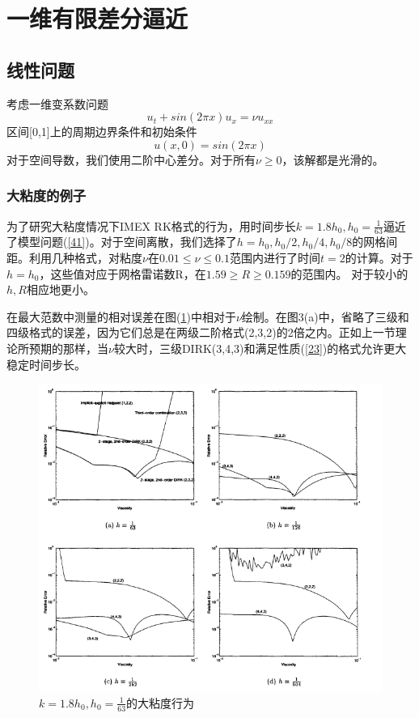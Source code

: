 \documentclass[12pt,a4paper]{article}
\begin{document}
\section{一维有限差分逼近}
\subsection{线性问题}

考虑一维变系数问题
\begin{equation}
u_{t}+sin(2\pi x)u_{x}=\nu u_{xx}
\label{41}
\end{equation}
区间[0,1]上的周期边界条件和初始条件
\begin{equation*}
u(x,0)=sin(2\pi x)
\end{equation*}
对于空间导数，我们使用二阶中心差分。对于所有$\nu\ge 0$，该解都是光滑的。

\subsubsection{大粘度的例子}

为了研究大粘度情况下IMEX RK格式的行为，用时间步长$k=1.8h_{0},h_{0}=\frac{1}{63}$逼近了模型问题(\ref{41})。对于空间离散，我们选择了$h=h_{0},h_{0}/2,h_{0}/4,h_{0}/8$的网格间距。利用几种格式，对粘度$\nu$在$0.01\le \nu\le 0.1$范围内进行了时间$t=2$的计算。对于$h=h_{0}$，这些值对应于网格雷诺数R，在$1.59\ge R\ge 0.159$的范围内。 对于较小的$h,R$相应地更小。

在最大范数中测量的相对误差在图(\ref{figures3})中相对于$\nu$绘制。在图3(a)中，省略了三级和四级格式的误差，因为它们总是在两级二阶格式(2,3,2)的2倍之内。正如上一节理论所预期的那样，当$\nu$较大时，三级DIRK(3,4,3)和满足性质(\ref{23})的格式允许更大稳定时间步长。
\begin{figure}[H]
\includegraphics[width=15cm]{./figures/3.png}
\caption{$k=1.8h_{0},h_{0}=\frac{1}{63}$的大粘度行为}
\centering
\label{figures3}
\end{figure}
\end{document}
